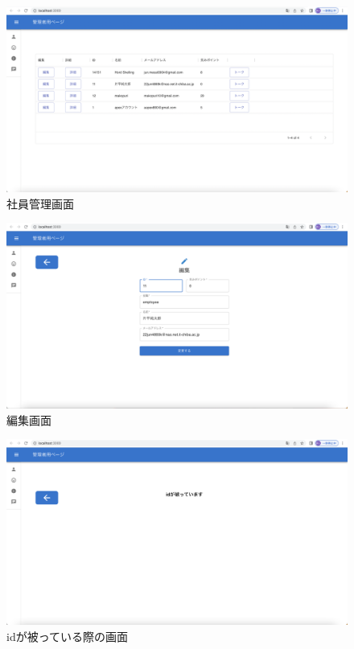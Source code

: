 \begin{figure}[!h]
	\begin{center}
			\includegraphics[scale=0.3, clip]{./img/sample6.png}
			\caption{社員管理画面}
			\label{fig:図の名前}
	\end{center}
\end{figure}

\begin{figure}[!h]
	\begin{center}
			\includegraphics[scale=0.3, clip]{./img/sample7.png}
			\caption{編集画面}
			\label{fig:図の名前}
	\end{center}
\end{figure}

\clearpage

\begin{figure}[!h]
	\begin{center}
			\includegraphics[scale=0.3, clip]{./img/sample8.png}
			\caption{idが被っている際の画面}
			\label{fig:図の名前}
	\end{center}
\end{figure}

